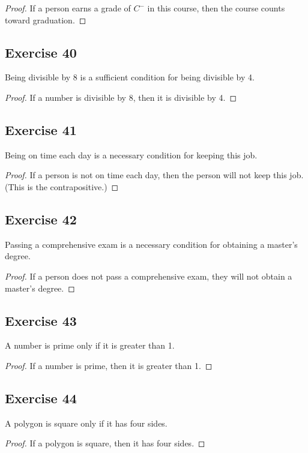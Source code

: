 \documentclass[14pt]{extarticle}
\begin{document}
\begin{proof}
If a person earns a grade of $C^-$ in this course, then the course counts toward graduation.
\end{proof}

\subsection{Exercise 40}
Being divisible by 8 is a sufficient condition for being divisible by 4.

\begin{proof}
If a number is divisible by 8, then it is divisible by 4.
\end{proof}

\subsection{Exercise 41}
Being on time each day is a necessary condition for keeping this job.

\begin{proof}
If a person is not on time each day, then the person will
not keep this job. (This is the contrapositive.)
\end{proof}

\subsection{Exercise 42}
Passing a comprehensive exam is a necessary condition for obtaining a master’s degree.

\begin{proof}
If a person does not pass a comprehensive exam, they will not obtain a master's degree.
\end{proof}

\subsection{Exercise 43}
A number is prime only if it is greater than 1.

\begin{proof}
If a number is prime, then it is greater than 1.
\end{proof}

\subsection{Exercise 44}
A polygon is square only if it has four sides.

\begin{proof}
If a polygon is square, then it has four sides.
\end{proof}
\end{document}
